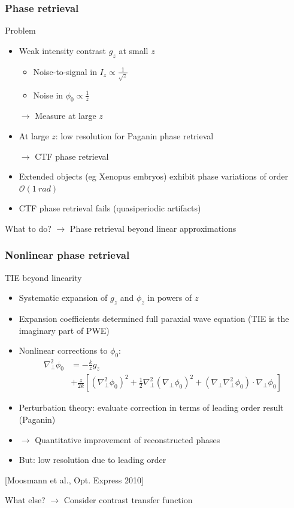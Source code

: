 \documentclass{beamer}
\newcommand{\reff}[1]{\begin{flushright}\scriptsize [#1]\end{flushright}}
\newcommand{\np}{\nabla_\perp}
\newcommand{\order}{\mathcal{O}}
\newcommand{\rar}{\rightarrow}
\begin{document}
\begin{frame}
  \frametitle{Phase retrieval}
  Problem
  \begin{itemize}
  \item Weak intensity contrast $g_z$ at small $z$
    \begin{itemize}
    \item Noise-to-signal in $I_z\propto\frac{1}{\sqrt{z}}$
    \item Noise in $\phi_0\propto\frac{1}{z}$
    \end{itemize}

    $\rar$ Measure at large $z$
  \item At large $z$: low resolution for Paganin phase retrieval

    $\rar$ CTF phase retrieval
  \item Extended objects (eg Xenopus embryos) exhibit phase variations
    of order $\order(\SI{1}{rad})$
  \item CTF phase retrieval fails (quasiperiodic artifacts)
  \end{itemize}

  What to do?  $\rar$ Phase retrieval beyond linear approximations
\end{frame}


\begin{frame}
  \frametitle{Nonlinear phase retrieval}
  
  TIE beyond linearity
  \begin{itemize}
  \item Systematic expansion of $g_z$ and $\phi_z$ in powers of $z$
  \item Expansion coefficients determined full paraxial wave equation
    (TIE is the imaginary part of PWE)
  \item Nonlinear corrections to $\phi_0$:
    \begin{equation*}
      \begin{split}
        \np^2\phi_{0}&=-\frac{k}{z}g_z\\
        &+\frac{z}{2k}\left[
          \left(\nabla_\perp^2\phi_{0}\right)^2 +\tfrac12 \nabla_\perp^2
        \left(\nabla_\perp\phi_{0}\right)^2 +\left(\nabla_\perp
          \nabla_\perp^2 \phi_{0}\right) \cdot \nabla_\perp \phi_{0}
        \right] 
      \end{split}
    \end{equation*}
  \item Perturbation theory: evaluate correction in terms of leading
    order result (Paganin)
  \item $\rar$ Quantitative improvement of reconstructed phases
  \item But: low resolution due to leading order
  \end{itemize}
       \reff{Moosmann et al., Opt. Express 2010}

   What else? $\rar$ Consider contrast transfer function
\end{frame}
\end{document}

